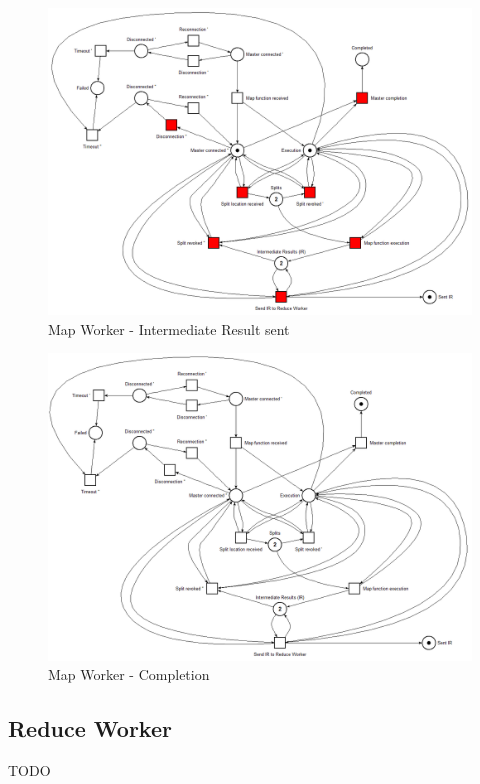 \begin{figure}[!ht]
    \centering
    \includegraphics[width=\linewidth]{document/chapters/chapter_6/images/map_worker_petri_net_3.png}
    \caption{Map Worker - Intermediate Result sent}
    \label{fig:map_worker_petri_net_3}
\end{figure}

\begin{figure}[!ht]
    \centering
    \includegraphics[width=\linewidth]{document/chapters/chapter_6/images/map_worker_petri_net_4.png}
    \caption{Map Worker - Completion}
    \label{fig:map_worker_petri_net_4}
\end{figure}

\subsection{Reduce Worker}
TODO

